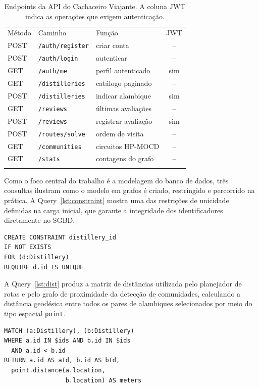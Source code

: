 \documentclass{jaes}
\begin{document}
\begin{table}[t]
\centering
\caption{Endpoints da API do Cachaceiro Viajante. A coluna JWT indica as operações que exigem autenticação.}
\label{tab:endpoints}
{\small
\begin{tabular}{@{}lllc@{}}\toprule
Método & Caminho & Função & JWT\\\colrule
POST & \texttt{/auth/register} & criar conta & --\\
POST & \texttt{/auth/login} & autenticar & --\\
GET & \texttt{/auth/me} & perfil autenticado & sim\\
GET & \texttt{/distilleries} & catálogo paginado & --\\
POST & \texttt{/distilleries} & indicar alambique & sim\\
GET & \texttt{/reviews} & últimas avaliações & --\\
POST & \texttt{/reviews} & registrar avaliação & sim\\
POST & \texttt{/routes/solve} & ordem de visita & --\\
GET & \texttt{/communities} & circuitos HP-MOCD & --\\
GET & \texttt{/stats} & contagens do grafo & --\\\botrule
\end{tabular}}
\end{table}

Como o foco central do trabalho é a modelagem do banco de dados, três consultas ilustram como o modelo em grafos é criado, restringido e percorrido na prática. A Query~\ref{lst:constraint} mostra uma das restrições de unicidade definidas na carga inicial, que garante a integridade dos identificadores diretamente no SGBD.

\begin{lstlisting}[caption={Restrição de unicidade definida sobre os nós \texttt{Distillery}.}, label={lst:constraint}]
CREATE CONSTRAINT distillery_id
IF NOT EXISTS
FOR (d:Distillery)
REQUIRE d.id IS UNIQUE
\end{lstlisting}

A Query~\ref{lst:dist} produz a matriz de distâncias utilizada pelo planejador de rotas e pelo grafo de proximidade da detecção de comunidades, calculando a distância geodésica entre todos os pares de alambiques selecionados por meio do tipo espacial \texttt{point}.

\begin{lstlisting}[caption={Cálculo das distâncias par a par com a função espacial \texttt{point.distance}.}, label={lst:dist}]
MATCH (a:Distillery), (b:Distillery)
WHERE a.id IN $ids AND b.id IN $ids
  AND a.id < b.id
RETURN a.id AS aId, b.id AS bId,
  point.distance(a.location,
                 b.location) AS meters
\end{lstlisting}
\end{document}
